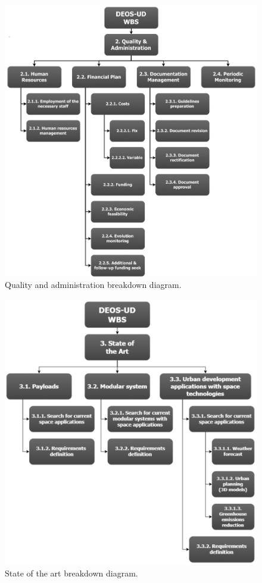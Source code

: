 \begin{figure}[H]
	\centering
	\includegraphics[width=\textwidth]{./sections/2.WBS/WBS_Section2}
	\caption[Quality and administration breakdown diagram]{Quality and administration breakdown diagram.}
	\label{fig:WBS_Section2}
\end{figure}

\begin{figure}[H]
	\centering
	\includegraphics[width=\textwidth]{./sections/2.WBS/WBS_Section3}
	\caption[State of the art breakdown diagram]{State of the art breakdown diagram.}
	\label{fig:WBS_Section3}
\end{figure}

